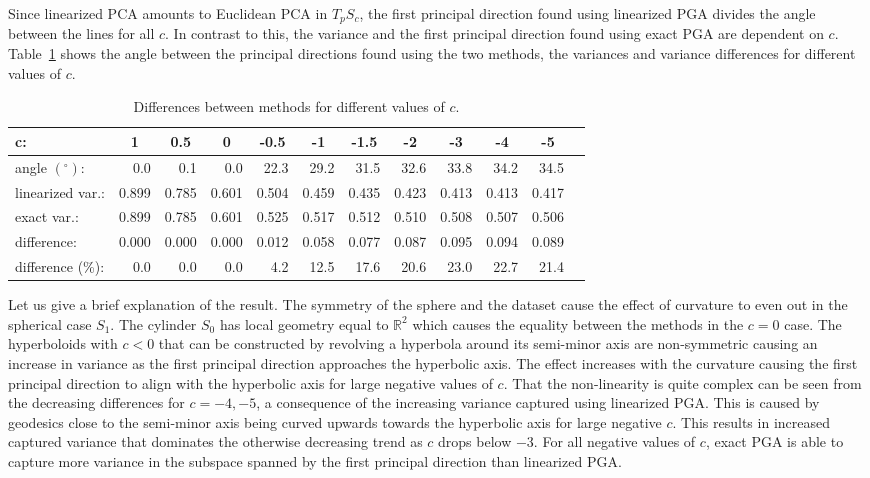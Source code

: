 \documentclass[final]{svjour3}
\newcommand{\RR}{\mathbb{R}}
\begin{document}
Since linearized PCA amounts to Euclidean PCA in $T_pS_c$, the first principal
direction found using linearized PGA divides the angle between the lines for all $c$. 
In contrast to this, the variance and the
first principal direction found using exact PGA are dependent on $c$.
Table~\ref{table:low1} shows the angle between the principal directions found
using the two methods, the variances and variance differences for different
values of $c$. 
\begin{table}[ht]
    \scriptsize
    \setlength{\tabcolsep}{5pt}
\begin{center}
\begin{tabular}{lrrrrrrrrrrr}
  \hline
  \bf{c}: & 
  \multicolumn{1}{c}{\bf{1}} & 
  \multicolumn{1}{c}{\bf{0.5}} &
  \multicolumn{1}{c}{\bf{0}} &
  \multicolumn{1}{c}{\bf{-0.5}} &
  \multicolumn{1}{c}{\bf{-1}} &
  \multicolumn{1}{c}{\bf{-1.5}} &
  \multicolumn{1}{c}{\bf{-2}} & 
  \multicolumn{1}{c}{\bf{-3}} &
  \multicolumn{1}{c}{\bf{-4}} &
  \multicolumn{1}{c}{\bf{-5}}\\
  \hline
  angle $(^\circ)$:     & 0.0   & 0.1   & 0.0   & 22.3  & 29.2  & 31.5  & 32.6 & 33.8  & 34.2   & 34.5 \\
  linearized var.:         & 0.899 & 0.785 & 0.601 & 0.504 & 0.459 & 0.435 & 0.423 & 0.413 & 0.413 & 0.417 \\
  exact var.:           & 0.899 & 0.785 & 0.601 & 0.525 & 0.517 & 0.512 & 0.510 & 0.508 & 0.507 & 0.506 \\
  difference:           & 0.000 & 0.000 & 0.000 & 0.012 & 0.058 & 0.077 & 0.087 & 0.095 & 0.094 & 0.089 \\
  difference (\%):      & 0.0   & 0.0   & 0.0   & 4.2   & 12.5  & 17.6  & 20.6 & 23.0  & 22.7   & 21.4 \\
   \hline
\end{tabular}
\caption{Differences between methods for different values of $c$.}
\label{table:low1}
\end{center}
\end{table}

Let us give a brief explanation of the result. The symmetry of the sphere and the
dataset cause the effect of curvature to even out in the spherical case $S_1$.
The cylinder $S_0$ has local geometry equal to $\RR^2$ which causes the equality
between the methods in the $c=0$ case. The hyperboloids with $c<0$ that 
can be constructed by revolving a hyperbola around its semi-minor axis
are non-symmetric causing an increase in variance as the first 
principal direction approaches the
hyperbolic axis. The effect increases with the curvature causing 
the first principal direction to align with the hyperbolic axis for large negative 
values of $c$. That the non-linearity is quite complex can be seen from the
decreasing differences for $c=-4,-5$, a consequence of the increasing variance captured
using linearized PGA. This is caused by geodesics close to the semi-minor axis
being curved upwards towards the hyperbolic axis for large negative $c$. This
results in increased captured variance that dominates the otherwise decreasing trend as $c$ drops
below $-3$.
For all negative values of $c$, exact PGA is able to capture 
more variance in the subspace spanned by the first principal direction than
linearized PGA.
\end{document}
